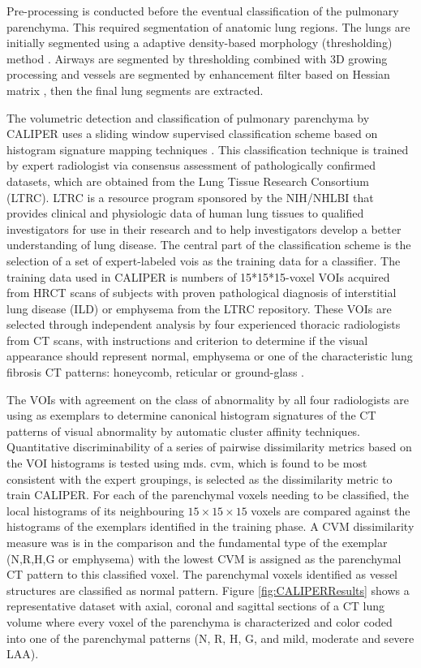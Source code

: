Pre-processing is conducted before the eventual classification of the pulmonary parenchyma. This required segmentation of anatomic lung regions. The lungs are initially segmented using a adaptive density-based morphology (thresholding) method \citep{hu2001automatic}. Airways are segmented by thresholding combined with 3D growing processing and vessels are segmented by enhancement filter based on Hessian matrix \citep{sato2000tissue}, then the final lung segments are extracted. 

The volumetric detection and classification of pulmonary parenchyma by CALIPER uses a sliding window supervised classification scheme based on histogram signature mapping techniques \citep{zavaletta2007high}. This classification technique is trained by expert radiologist via consensus assessment of pathologically confirmed datasets, which are obtained from the Lung Tissue Research Consortium (LTRC). LTRC is a resource program sponsored by the NIH/NHLBI that provides clinical and physiologic data of human lung tissues to qualified investigators for use in their research and to help investigators develop a better understanding of lung disease. The central part of the classification scheme is the selection of a set of expert-labeled \gls{vois} as the training data for a classifier. The training data used in CALIPER is numbers of 15*15*15-voxel VOIs acquired from HRCT scans of subjects with proven pathological diagnosis of interstitial lung disease (ILD) or emphysema from the LTRC repository. These VOIs are selected through independent analysis by four experienced thoracic radiologists from CT scans, with instructions and criterion to determine if the visual appearance should represent normal, emphysema or one of the characteristic lung fibrosis CT patterns: honeycomb, reticular or ground-glass \citep{maldonado2013automated,bartholmai2013quantitative}.

The VOIs with agreement on the class of abnormality by all four radiologists are using as exemplars to determine canonical histogram signatures of the CT patterns of visual abnormality by automatic cluster affinity techniques. Quantitative discriminability of a series of pairwise dissimilarity metrics based on the VOI histograms is tested using \gls{mds}. \gls{cvm}, which is found to be most consistent with the expert groupings, is selected as the dissimilarity metric to train CALIPER. For each of the parenchymal voxels needing to be classified, the local histograms of its neighbouring $15 \times 15 \times 15$ voxels are compared against the histograms of the exemplars identified in the training phase. A CVM dissimilarity measure was is in the comparison and the fundamental type of the exemplar (N,R,H,G or emphysema) with the lowest CVM is assigned as the parenchymal CT pattern to this classified voxel. The parenchymal voxels identified as vessel structures are classified as normal pattern. Figure \ref{fig:CALIPERResults} shows a representative dataset with axial, coronal and sagittal sections of a CT lung volume where every voxel of the parenchyma is characterized and color coded into one of the parenchymal patterns (N, R, H, G, and mild, moderate and severe LAA). 

